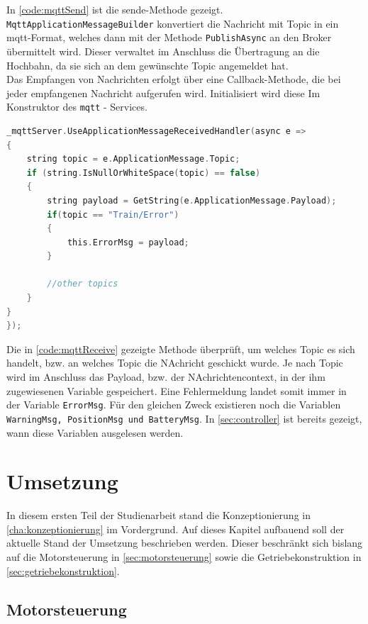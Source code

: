 In \autoref{code:mqttSend} ist die sende-Methode gezeigt. \texttt{MqttApplicationMessageBuilder} konvertiert die Nachricht mit Topic in ein \acrshort{mqtt}-Format, welches dann mit der Methode \texttt{PublishAsync} an den Broker übermittelt wird. Dieser verwaltet im Anschluss die Übertragung an die Hochbahn, da sie sich an dem gewünschte Topic angemeldet hat.\\
Das Empfangen von Nachrichten erfolgt über eine Callback-Methode, die bei jeder empfangenen Nachricht aufgerufen wird. Initialisiert wird diese Im Konstruktor des \texttt{mqtt} - Services.

\begin{lstlisting}[language=c, style=dhpaperdefault]
_mqttServer.UseApplicationMessageReceivedHandler(async e =>
{
	string topic = e.ApplicationMessage.Topic;
	if (string.IsNullOrWhiteSpace(topic) == false)
	{
		string payload = GetString(e.ApplicationMessage.Payload);
		if(topic == "Train/Error")
		{
			this.ErrorMsg = payload;
		}
		
		//other topics
	}
}
});

\end{lstlisting}
\vspace{0.5cm}

Die in \autoref{code:mqttReceive} gezeigte Methode überprüft, um welches Topic es sich handelt, bzw. an welches Topic die NAchricht geschickt wurde. Je nach Topic wird im Anschluss das Payload, bzw. der NAchrichtencontext, in der ihm zugewiesenen Variable gespeichert. Eine Fehlermeldung landet somit immer in der Variable \texttt{ErrorMsg}. Für den gleichen Zweck existieren noch die Variablen \texttt{WarningMsg, PositionMsg und BatteryMsg}. In \autoref{sec:controller} ist bereits gezeigt, wann diese Variablen ausgelesen werden. 

\chapter{Umsetzung} 
\label{cha:umsetzung}
In diesem ersten Teil der Studienarbeit stand die Konzeptionierung in \autoref{cha:konzeptionierung} im Vordergrund. Auf dieses Kapitel aufbauend soll der aktuelle Stand der Umsetzung beschrieben werden. Dieser beschränkt sich bislang auf die Motorsteuerung in \autoref{sec:motorsteuerung} sowie die Getriebekonstruktion in \autoref{sec:getriebekonstruktion}.
\newpage
 
\section{Motorsteuerung}
\label{sec:motorsteuerung}

